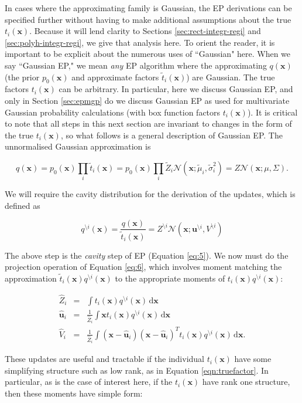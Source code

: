 \documentclass[twoside,11pt]{article}
\def\x{{\mathbf x}}
\def\u{{\mathbf u}}
\newcommand{\N}{\mathcal{N}}
\renewcommand{\d}{\,\mathrm{d}}
\newcommand{\wo}{\setminus}
\begin{document}
In cases where the approximating family is Gaussian, the EP derivations can be specified further without having to make additional assumptions about the true $t_i(\x)$. Because it will lend clarity to Sections \ref{sec:rect-integr-regi} and \ref{sec:polyh-integr-regi}, we give that analysis here.  To orient the reader, it is important to be explicit about the numerous uses of ``Gaussian" here.  When we say ``Gaussian EP," we mean \emph{any} EP algorithm where the approximating $q(\x)$ (the prior $p_0(\x)$ and approximate factors $\tilde{t}_i(\x)$) are Gaussian.  The true factors $t_i(\x)$  can be arbitrary.  In particular, here we discuss Gaussian EP, and only in Section \ref{sec:epmgp} do we discuss Gaussian EP as used for multivariate Gaussian probability calculations (with box function factors $t_i(\x)$).  It is critical to note that all steps in this next section are invariant to changes in the form of the true $t_i(\x)$, so what follows is a general description of Gaussian EP.  The unnormalised Gaussian approximation is 
 
\begin{equation}
q(\x) = p_0(\x)\prod_i \tilde{t}_i(\x) = p_0(\x)\prod_i \tilde{Z}_i\mathcal{N}(\x; \tilde{\mu}_i,\tilde{\sigma}_i^2) = Z \N(\x; \mu, \Sigma).
\end{equation}

We will require the cavity
distribution for the derivation of the updates, which is defined as

\begin{equation}
q^{\wo i}(\x) = \frac{q(\x)}{\tilde{t}_i(\x)} = Z^{\wo i} \N(\x ; \u^{\wo i} , V^{\wo i})
\end{equation}

The above step is the \emph{cavity} step of EP (Equation \ref{eq:5}).  We now must do the projection operation of Equation \ref{eq:6}, which involves moment matching the approximation $\tilde{t}_i(\x)q^{\wo i}(\x)$ to the appropriate moments of $t_i(\x)q^{\wo i}(\x)$:

\begin{eqnarray}
\label{eqn:moments}
\hat{Z}_i & = & \int t_i(\x) q^{\wo i}(\x) \d\x  \\
\hat{\u}_i & = & \frac{1}{\hat{Z}_i}\int \x t_i(\x) q^{\wo i}(\x) \d\x  \\
\hat{V}_i & = & \frac{1}{\hat{Z}_i}\int (\x - \hat{\u}_i)(\x - \hat{\u}_i)^T t_i(\x) q^{\wo i}(\x) \d\x. 
\end{eqnarray}

These updates are useful and tractable if the individual $t_i(\x)$ have some simplifying structure such as low rank, as in Equation \ref{eqn:truefactor}.  In particular, as is the case of interest here, if the $t_i(\x)$ have rank one structure, then these moments have simple form:
\end{document}
